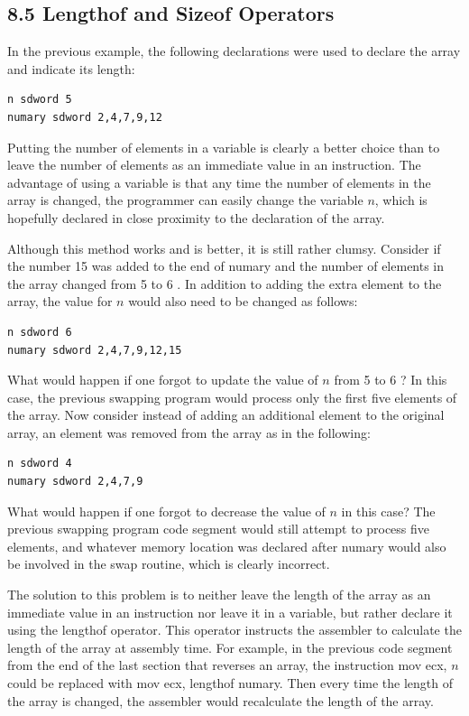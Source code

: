\documentclass[10pt]{book}
\begin{document}
\subsection*{8.5 Lengthof and Sizeof Operators}
In the previous example, the following declarations were used to declare the array and indicate its length:

\begin{verbatim}
n sdword 5
numary sdword 2,4,7,9,12
\end{verbatim}

Putting the number of elements in a variable is clearly a better choice than to leave the number of elements as an immediate value in an instruction. The advantage of using a variable is that any time the number of elements in the array is changed, the programmer can easily change the variable $n$, which is hopefully declared in close proximity to the declaration of the array.

Although this method works and is better, it is still rather clumsy. Consider if the number 15 was added to the end of numary and the number of elements in the array changed from 5 to 6 . In addition to adding the extra element to the array, the value for $n$ would also need to be changed as follows:


\begin{verbatim}
n sdword 6
numary sdword 2,4,7,9,12,15
\end{verbatim}

What would happen if one forgot to update the value of $n$ from 5 to 6 ? In this case, the previous swapping program would process only the first five elements of the array. Now consider instead of adding an additional element to the original array, an element was removed from the array as in the following:

\begin{verbatim}
n sdword 4
numary sdword 2,4,7,9
\end{verbatim}

What would happen if one forgot to decrease the value of $n$ in this case? The previous swapping program code segment would still attempt to process five elements, and whatever memory location was declared after numary would also be involved in the swap routine, which is clearly incorrect.

The solution to this problem is to neither leave the length of the array as an immediate value in an instruction nor leave it in a variable, but rather declare it using the lengthof operator. This operator instructs the assembler to calculate the length of the array at assembly time. For example, in the previous code segment from the end of the last section that reverses an array, the instruction mov ecx, $n$ could be replaced with mov ecx, lengthof numary. Then every time the length of the array is changed, the assembler would recalculate the length of the array.
\end{document}
